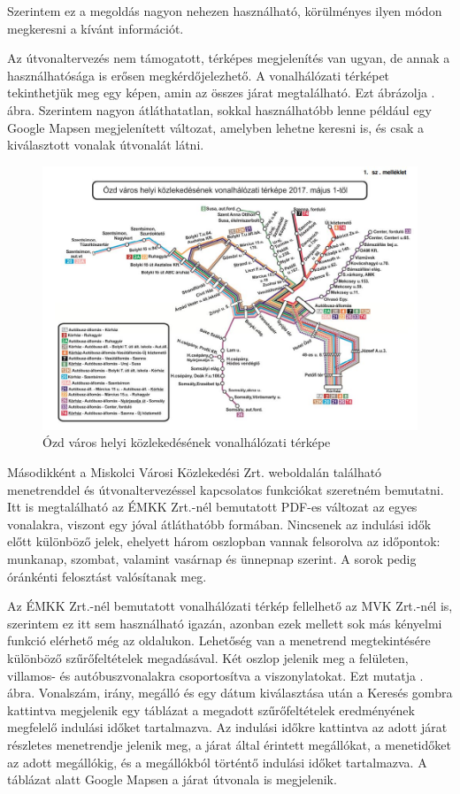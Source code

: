 Szerintem ez a megoldás nagyon nehezen használható, körülményes ilyen módon megkeresni a kívánt információt.

Az útvonaltervezés nem támogatott, térképes megjelenítés van ugyan, de annak a használhatósága is erősen megkérdőjelezhető. A vonalhálózati térképet tekinthetjük meg egy képen, amin az összes járat megtalálható. Ezt ábrázolja . ábra. Szerintem nagyon átláthatatlan, sokkal használhatóbb lenne például egy Google Mapsen megjelenített változat, amelyben lehetne keresni is, és csak a kiválasztott vonalak útvonalát látni.

\begin{figure}[h!]
\centering
\includegraphics[scale=0.6]{kepek/EMKK_vonalhalozat.jpg}
\caption{Ózd város helyi közlekedésének vonalhálózati térképe}
\label{fig:EMKK_vonalhalozat}
\end{figure}

Másodikként a Miskolci Városi Közlekedési Zrt. weboldalán található menetrenddel és útvonaltervezéssel kapcsolatos funkciókat szeretném bemutatni. Itt is megtalálható az ÉMKK Zrt.-nél bemutatott PDF-es változat az egyes vonalakra, viszont egy jóval átláthatóbb formában. Nincsenek az indulási idők előtt különböző jelek, ehelyett három oszlopban vannak felsorolva az időpontok: munkanap, szombat, valamint vasárnap és ünnepnap szerint. A sorok pedig óránkénti felosztást valósítanak meg.

Az ÉMKK Zrt.-nél bemutatott vonalhálózati térkép fellelhető az MVK Zrt.-nél is, szerintem ez itt sem használható igazán, azonban ezek mellett sok más kényelmi funkció elérhető még az oldalukon. Lehetőség van a menetrend megtekintésére különböző szűrőfeltételek megadásával. Két oszlop jelenik meg a felületen, villamos- és autóbuszvonalakra csoportosítva a viszonylatokat. Ezt mutatja . ábra. Vonalszám, irány, megálló és egy dátum kiválasztása után a Keresés gombra kattintva megjelenik egy táblázat a megadott szűrőfeltételek eredményének megfelelő indulási időket tartalmazva. Az indulási időkre kattintva az adott járat részletes menetrendje jelenik meg, a járat által érintett megállókat, a menetidőket az adott megállókig, és a megállókból történtő indulási időket tartalmazva. A táblázat alatt Google Mapsen a járat útvonala is megjelenik.

